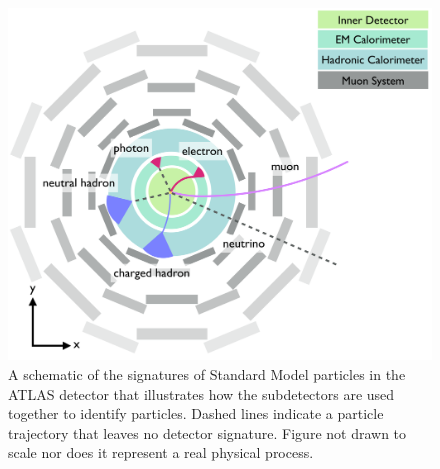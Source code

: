 \begin{figure}[htbp]
\centering
\includegraphics[width=.8\textwidth]{figures/Detector/particle-doodle.png}
\caption{A schematic of the signatures of Standard Model particles in the \ac{ATLAS} detector that illustrates how the subdetectors are used together to identify particles. Dashed lines indicate a particle trajectory that leaves no detector signature. Figure not drawn to scale nor does it represent a real physical process.}
\label{fig:particle-doodles}
\end{figure}




